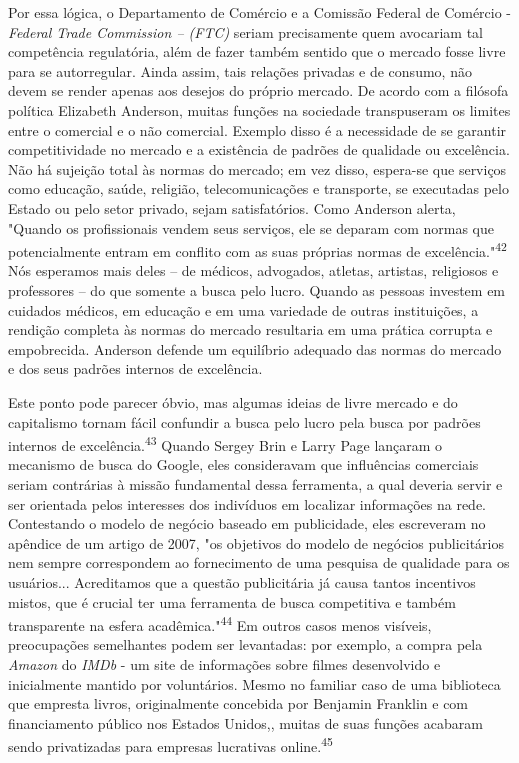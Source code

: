 Por essa lógica, o Departamento de Comércio e a Comissão Federal de
Comércio - \emph{Federal Trade Commission -- (FTC)} seriam precisamente
quem avocariam tal competência regulatória, além de fazer também sentido
que o mercado fosse livre para se autorregular. Ainda assim, tais
relações privadas e de consumo, não devem se render apenas aos desejos
do próprio mercado. De acordo com a filósofa política Elizabeth
Anderson, muitas funções na sociedade transpuseram os limites entre o
comercial e o não comercial. Exemplo disso é a necessidade de se
garantir competitividade no mercado e a existência de padrões de
qualidade ou excelência. Não há sujeição total às normas do mercado; em
vez disso, espera-se que serviços como educação, saúde, religião,
telecomunicações e transporte, se executadas pelo Estado ou pelo setor
privado, sejam satisfatórios. Como Anderson alerta, "Quando os
profissionais vendem seus serviços, ele se deparam com normas que
potencialmente entram em conflito com as suas próprias normas de
excelência."\textsuperscript{{42}} Nós esperamos mais deles -- de
médicos, advogados, atletas, artistas, religiosos e professores -- do
que somente a busca pelo lucro. Quando as pessoas investem em cuidados
médicos, em educação e em uma variedade de outras instituições, a
rendição completa às normas do mercado resultaria em uma prática
corrupta e empobrecida. Anderson defende um equilíbrio adequado das
normas do mercado e dos seus padrões internos de excelência.

Este ponto pode parecer óbvio, mas algumas ideias de livre mercado e do
capitalismo tornam fácil confundir a busca pelo lucro pela busca por
padrões internos de excelência.\textsuperscript{{43}} Quando Sergey Brin
e Larry Page lançaram o mecanismo de busca do Google, eles consideravam
que influências comerciais seriam contrárias à missão fundamental dessa
ferramenta, a qual deveria servir e ser orientada pelos interesses dos
indivíduos em localizar informações na rede. Contestando o modelo de
negócio baseado em publicidade, eles escreveram no apêndice de um artigo
de 2007, "os objetivos do modelo de negócios publicitários nem sempre
correspondem ao fornecimento de uma pesquisa de qualidade para os
usuários... Acreditamos que a questão publicitária já causa tantos
incentivos mistos, que é crucial ter uma ferramenta de busca competitiva
e também transparente na esfera acadêmica."\textsuperscript{{44}} Em
outros casos menos visíveis, preocupações semelhantes podem ser
levantadas: por exemplo, a compra pela \emph{Amazon} do \emph{IMDb} - um
site de informações sobre filmes desenvolvido e inicialmente mantido por
voluntários. Mesmo no familiar caso de uma biblioteca que empresta
livros, originalmente concebida por Benjamin Franklin e com
financiamento público nos Estados Unidos,, muitas de suas funções
acabaram sendo privatizadas para empresas lucrativas
online.\textsuperscript{{45}}

